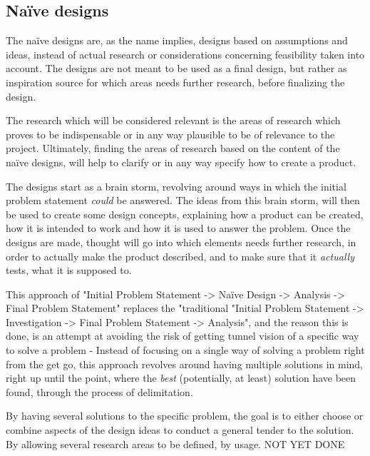 
\subsection{Naïve designs}
The naïve designs are, as the name implies, designs based on assumptions and ideas, instead of actual research or considerations concerning feasibility taken into account. The designs are not meant to be used as a final design, but rather as inspiration source for which areas needs further research, before finalizing the design.

The research which will be considered relevant is the areas of research which proves to be indispensable or in any way plausible to be of relevance to the project. Ultimately, finding the areas of research based on the content of the naïve designs, will help to clarify or in any way specify how to create a product.
\bigskip

The designs start as a brain storm, revolving around ways in which the initial problem statement \textit{could} be answered. The ideas from this brain storm, will then be used to create some design concepts, explaining how a product can be created, how it is intended to work and how it is used to answer the problem. Once the designs are made, thought will go into which elements needs further research, in order to actually make the product described, and to make sure that it \textit{actually} tests, what it is supposed to.
\bigskip

This approach of "Initial Problem Statement -> Naïve Design -> Analysis -> Final Problem Statement" replaces the "traditional "Initial Problem Statement -> Investigation -> Final Problem Statement -> Analysis", and the reason this is done, is an attempt at avoiding the risk of getting tunnel vision of a specific way to solve a problem - Instead of focusing on a single way of solving a problem right from the get go, this approach revolves around having multiple solutions in mind, right up until the point, where the \textit{best} (potentially, at least) solution have been found, through the process of delimitation. 

By having several solutions to the specific problem, the goal is to either choose or combine aspects of the design ideas to conduct a general tender to the solution. By allowing several research areas to be defined, by usage. NOT YET DONE
